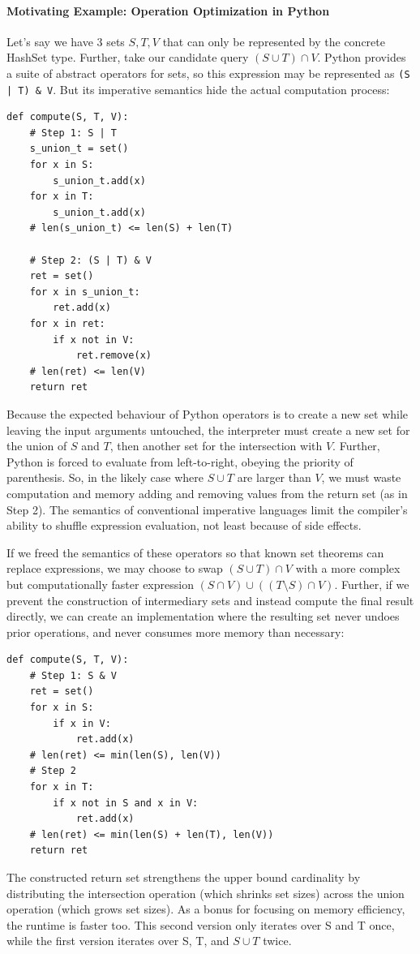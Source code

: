 \documentclass{article}
\begin{document}
\paragraph{Motivating Example: Operation Optimization in Python}
Let's say we have 3 sets $S, T, V$ that can only be represented by the concrete HashSet type. Further, take our candidate query $(S \cup T) \cap V$. Python provides a suite of abstract operators for sets, so this expression may be represented as \texttt{(S | T) \& V}. But its imperative semantics hide the actual computation process:
\begin{verbatim}
def compute(S, T, V):
    # Step 1: S | T
    s_union_t = set()
    for x in S:
        s_union_t.add(x)
    for x in T:
        s_union_t.add(x)
    # len(s_union_t) <= len(S) + len(T)

    # Step 2: (S | T) & V
    ret = set()
    for x in s_union_t:
        ret.add(x)
    for x in ret:
        if x not in V:
            ret.remove(x)
    # len(ret) <= len(V)
    return ret
\end{verbatim}
Because the expected behaviour of Python operators is to create a new set while leaving the input arguments untouched, the interpreter must create a new set for the union of $S$ and $T$, then another set for the intersection with $V$. Further, Python is forced to evaluate from left-to-right, obeying the priority of parenthesis. So, in the likely case where $S \cup T$ are larger than $V$, we must waste computation and memory adding and removing values from the return set (as in Step 2). The semantics of conventional imperative languages limit the compiler's ability to shuffle expression evaluation, not least because of side effects.

If we freed the semantics of these operators so that known set theorems can replace expressions, we may choose to swap $(S \cup T) \cap V$ with a more complex but computationally faster expression $(S \cap V) \cup ((T \setminus S) \cap V)$. Further, if we prevent the construction of intermediary sets and instead compute the final result directly, we can create an implementation where the resulting set never undoes prior operations, and never consumes more memory than necessary:
\begin{verbatim}
def compute(S, T, V):
    # Step 1: S & V
    ret = set()
    for x in S:
        if x in V:
            ret.add(x)
    # len(ret) <= min(len(S), len(V))
    # Step 2
    for x in T:
        if x not in S and x in V:
            ret.add(x)
    # len(ret) <= min(len(S) + len(T), len(V))
    return ret
\end{verbatim}
The constructed return set strengthens the upper bound cardinality by distributing the intersection operation (which shrinks set sizes) across the union operation (which grows set sizes). As a bonus for focusing on memory efficiency, the runtime is faster too. This second version only iterates over S and T once, while the first version iterates over S, T, and $S \cup T$ twice.
\end{document}
